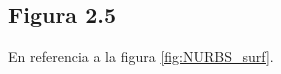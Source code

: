 \documentclass[11pt]{book}
\theoremstyle{plain} %
\theoremstyle{definition} %
\theoremstyle{definition} %
\begin{document}
%
%
%
%
%

\subsection{Figura 2.5}\label{exp_fig:NURBS_surf}
En referencia a la figura \ref{fig:NURBS_surf}.
\end{document}
